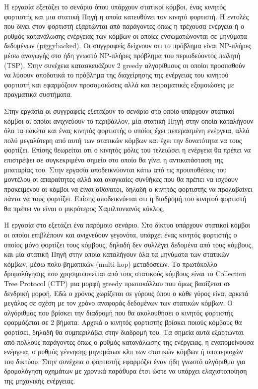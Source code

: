 Η εργασία \cite{prolonging_j-roc} εξετάζει το σενάριο όπου υπάρχουν στατικοί κόμβοι, ένας κινητός φορτιστής και μια στατική Πηγή η οποία κατευθύνει τον κινητό
φορτιστή. Η εντολές που δίνει στον φορτιστή εξαρτώνται από παράγοντες όπως η τρέχουσα ενέργεια ή ο ρυθμός κατανάλωσης ενέργειας των κόμβων οι οποίες ενσωματώνονται σε
μηνύματα δεδομένων (piggybacked). Οι συγγραφείς δείχνουν οτι το πρόβλημα είναι NP-πλήρες μέσω αναγωγής στο ήδη γνωστό NP-πλήρες πρόβλημα του περιοδεύοντος πωλητή
(TSP). Στην συνέχεια κατασκευάζουν 2 greedy αλγορίθμους οι οποίοι προσπαθούν να λύσουν αποδοτικά το πρόβλημα της διαχείρησης της ενέργειας του κινητού φορτιστή και
εφαρμόζουν προσομοιώσεις αλλά και πειραματικές εξομοιώσεις με πραγματικά συστήματα.

Στην εργασία \cite{immortal_wsns} οι συγγραφείς εξετάζουν το σενάριο στο οποίο υπάρχουν στατικοί κόμβοι οι οποίοι ανιχνεύουν το περιβάλλον, μία στατική Πηγή στην
οποία καταλήγουν όλα τα πακέτα και ένας κινητός φορτιστής ο οποίος έχει πεπερασμένη ενέργεια, αλλά πολύ μεγαλύτερη από αυτή των στατικών κόμβων και έχει την
δυνατότητα να τους φορτίζει. Επίσης θεωρείται οτι ο κινητός μόλις του τελειώσει η ενέργεια θα πρέπει να επιστρέψει σε συγκεκριμένο σημείο στο οποίο θα γίνει η
αντικατάσταση της μπαταρίας του. Στην εργασία αποδεικνύονται κάτω από τις προυποθέσεις του μοντέλου οι απαραίτητες αλλά και αναγκαίες συνθήκες που θα πρέπει να
ισχύουν προκειμένου οι κόμβοι να είναι αθάνατοι, δηλαδή ο κινητός φορτιστής να προλαβαίνει πάντα να τους φορτίζει. Επίσης αποδεικνύεται οτι η διαδρομή του κινητού
φορτιστή θα πρέπει να είναι ο μικρότερος Χαμιλτονιανός κύκλος.

Η εργασία στο \cite{j-roc} εξετάζει ένα παρόμοιο σενάριο. Στο δίκτυο υπάρχουν στατικοί κόμβοι οι οποίοι επιβλέπουν και ανιχνεύουν γεγονότα, υπάρχει ένας κινητός
φορτιστής ο οποίος μόνο φορτίζει τους κόμβους, δηλαδή δεν συλλέγει δεδομένα από τους κόμβους, και μία στατική Πηγή στην οποία καταλήγουν όλα τα μηνύματα των στατικών
κόμβων, μέσω πολυ-βηματικών (multi-hop) μεταδόσεων. Το πρωτόκολλο δρομολόγησης που χρησιμοποιείται από τους στατικούς κόμβους είναι το Collection Tree Protocol (CTP)
μια μορφή greedy πρωτοκόλλου που όμως βασίζεται σε δενδρική μορφή. Εδώ ο χρόνος χωρίζεται σε γύρους όπου ο κάθε γύρος είναι αρκετά μεγάλος σε σχέση με τον χρόνο
αναφοράς δεδομένων των στατικών κόμβων. Ο αλγόριθμος που βρίσκει την διαδρομή που θα ακολουθήσει ο κινητός φορτιστής εφαρμόζεται σε 2 βήματα. Αρχικά ο κινητός
φορτιστής βρίσκει ποιούς κόμβους θα φορτίσει, δηλαδή θα συμπεριλάβει στην διαδρομή του. Τα σημεία αυτά εξαρτώνται από πολλούς παράγοντες όπως ο ρυθμός κατανάλωσης της
ενέργειας, η εναπομείνουσα ενέργεια, ο ρυθμός γέννησης μηνυμάτων κλπ των στατικών κόμβων ή υποπεριοχών του δικτύου. Στην συνέχεια ο φορτιστής εφαρμόζει έναν ήδη
γνωστό αλγόριθμο \cite{VRPTW_solver} για δρομολόγηση οχημάτων με χρονικά παράθυρα έτσι ώστε να υπάρχει ελαχιστοποίηση της μηχανικής ενέργειας.

